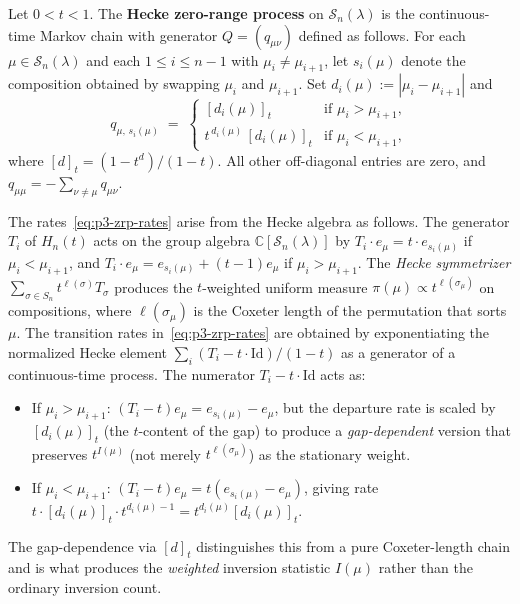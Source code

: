 \begin{definition}
\label{def:p3-hecke-zrp}
Let $0 < t < 1$. The \textbf{Hecke zero-range process} on
$\mathcal{S}_n(\lambda)$ is the continuous-time Markov chain with
generator $Q = (q_{\mu\nu})$ defined as follows. For each
$\mu \in \mathcal{S}_n(\lambda)$ and each $1 \leq i \leq n-1$ with
$\mu_i \neq \mu_{i+1}$, let $s_i(\mu)$ denote the composition obtained
by swapping $\mu_i$ and $\mu_{i+1}$. Set $d_{i}(\mu) := |\mu_i - \mu_{i+1}|$ and
\begin{equation}
\label{eq:p3-zrp-rates}
q_{\mu,\, s_i(\mu)} \;=\;
\begin{cases}
[d_i(\mu)]_t                           & \text{if } \mu_i > \mu_{i+1}, \\[6pt]
t^{\,d_i(\mu)}\, [d_i(\mu)]_t         & \text{if } \mu_i < \mu_{i+1},
\end{cases}
\end{equation}
where $[d]_t = (1 - t^d)/(1 - t)$. All other off-diagonal entries are
zero, and $q_{\mu\mu} = -\sum_{\nu \neq \mu} q_{\mu\nu}$.
\end{definition}

\begin{remark}
\label{rem:p3-hecke-origin}
The rates~\eqref{eq:p3-zrp-rates} arise from the Hecke algebra as follows.
The generator $T_i$ of $H_n(t)$ acts on the group algebra $\mathbb{C}[\mathcal{S}_n(\lambda)]$
by $T_i \cdot e_\mu = t \cdot e_{s_i(\mu)}$ if $\mu_i < \mu_{i+1}$, and
$T_i \cdot e_\mu = e_{s_i(\mu)} + (t-1) e_\mu$ if $\mu_i > \mu_{i+1}$.
The \emph{Hecke symmetrizer} $\sum_{\sigma \in S_n} t^{\ell(\sigma)} T_\sigma$
produces the $t$-weighted uniform measure $\pi(\mu) \propto t^{\ell(\sigma_\mu)}$
on compositions, where $\ell(\sigma_\mu)$ is the Coxeter length of the
permutation that sorts $\mu$. The transition rates in~\eqref{eq:p3-zrp-rates}
are obtained by exponentiating the normalized Hecke element
$\sum_i (T_i - t \cdot \mathrm{Id}) / (1-t)$ as a generator of a
continuous-time process. The numerator $T_i - t \cdot \mathrm{Id}$ acts as:
\begin{itemize}
\item If $\mu_i > \mu_{i+1}$: $(T_i - t) e_\mu = e_{s_i(\mu)} - e_\mu$,
  but the departure rate is scaled by $[d_i(\mu)]_t$ (the $t$-content of
  the gap) to produce a \emph{gap-dependent} version that preserves
  $t^{I(\mu)}$ (not merely $t^{\ell(\sigma_\mu)}$) as the stationary
  weight.
\item If $\mu_i < \mu_{i+1}$: $(T_i - t) e_\mu = t(e_{s_i(\mu)} - e_\mu)$,
  giving rate $t \cdot [d_i(\mu)]_t \cdot t^{d_i(\mu)-1} = t^{d_i(\mu)} [d_i(\mu)]_t$.
\end{itemize}
The gap-dependence via $[d]_t$ distinguishes this from a pure Coxeter-length
chain and is what produces the \emph{weighted} inversion statistic $I(\mu)$
rather than the ordinary inversion count.
\end{remark}


